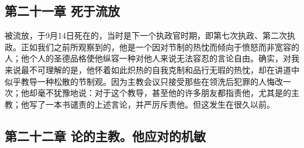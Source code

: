 
\subsection{第二十一章 死于流放}

被流放，于9月14日死在的，当时是下一个执政官时期，即第七次执政、第二次执政。正如我们之前所观察到的，他是一个因对节制的热忱而倾向于愤怒而非宽容的人；他个人的圣德品格使他纵容一种对他人来说无法容忍的言论自由。确实，对我来说最不可理解的是，他怀着如此炽热的自我克制和品行无瑕的热忱，却在讲道中似乎教导一种松散的节制观。因为主教会议只接受那些在领洗后犯罪的人悔改一次；他却毫不犹豫地说：对于这个教导，甚至他的许多朋友都指责他，尤其是的主教；他写了一本书谴责的上述言论，并严厉斥责他。但这发生在很久以前。\par


\subsection{第二十二章 论的主教。他应对的机敏}

